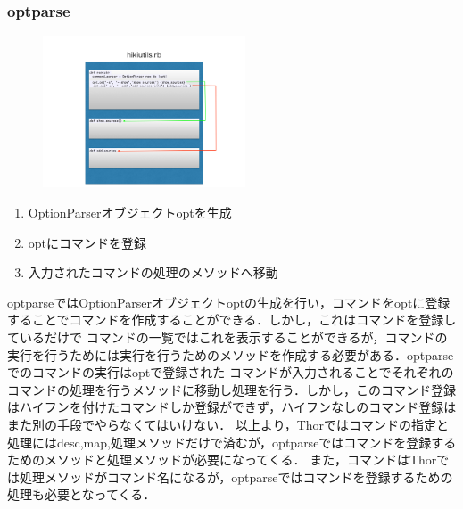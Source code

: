 \subsubsection{optparse}
\begin{figure}[htbp]\begin{center}
\includegraphics[width=6cm,bb=0 0 442 432]{../figs/./hikiutils_yamane_09_copy.005.jpg}
\caption{}
\label{default}\end{center}\end{figure}
\begin{enumerate}
\item OptionParserオブジェクトoptを生成
\item optにコマンドを登録
\item 入力されたコマンドの処理のメソッドへ移動
\end{enumerate}
optparseではOptionParserオブジェクトoptの生成を行い，コマンドをoptに登録することでコマンドを作成することができる．しかし，これはコマンドを登録しているだけで
コマンドの一覧ではこれを表示することができるが，コマンドの実行を行うためには実行を行うためのメソッドを作成する必要がある．optparseでのコマンドの実行はoptで登録された
コマンドが入力されることでそれぞれのコマンドの処理を行うメソッドに移動し処理を行う．しかし，このコマンド登録はハイフンを付けたコマンドしか登録ができず，ハイフンなしのコマンド登録は
また別の手段でやらなくてはいけない．
以上より，Thorではコマンドの指定と処理にはdesc,map,処理メソッドだけで済むが，optparseではコマンドを登録するためのメソッドと処理メソッドが必要になってくる．
また，コマンドはThorでは処理メソッドがコマンド名になるが，optparseではコマンドを登録するための処理も必要となってくる．

